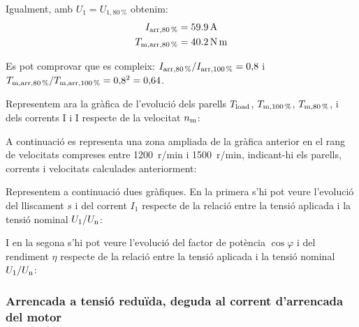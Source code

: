 \begin{exemple}
	Igualment, amb $U_1 = U_{1,\qty{80}{\%}}$ obtenim:
	\vspace{-2mm}
	\begin{align*}
		I_\mathrm{arr,\qty{80}{\%}} &=  \qty{59,9}{A} \\
		T_\mathrm{m,arr,\qty{80}{\%}} &=  \qty{40,2}{N.m} 
	\end{align*}
	
	Es pot comprovar que es compleix: $I_\mathrm{arr,\qty{80}{\%}} / I_\mathrm{arr,\qty{100}{\%}} = 0{,}8$ i $T_\mathrm{m,arr,\qty{80}{\%}} / T_\mathrm{m,arr,\qty{100}{\%}} = 0{,}8^2 = 0{,}64$.
		
 	Representem ara la gràfica de l'evolució dels parells $T_\mathrm{load}$,  $T_\mathrm{m,\qty{100}{\%}}$,  $T_\mathrm{m,\qty{80}{\%}}$, i dels	corrents I i I respecte de la velocitat $n_\mathrm{m}$:	
    \begin{center}
		\fontsize{10pt}{11pt}\selectfont
		
	\end{center}	

	\vspace{-2mm}
	A continuació es representa una zona ampliada de la gràfica anterior en el rang de velocitats compreses entre \qty{1200}{r/min} i  \qty{1500}{r/min}, indicant-hi els parells, corrents i velocitats calculades anteriorment:

	\begin{center}
		\fontsize{10pt}{11pt}\selectfont
		
	\end{center}

	Representem a continuació dues gràfiques. En la primera s'hi pot veure  l'evolució del lliscament $s$ i del corrent $I_1$ respecte de la relació entre la tensió aplicada i la tensió nominal $U_1/U_\mathrm{n}$:
	\begin{center}
		
	\end{center}
	
	I en la segona s'hi pot veure l'evolució del factor de potència $\cos\varphi$ i del rendiment $\eta$ respecte de la relació entre la tensió aplicada i la tensió nominal $U_1/U_\mathrm{n}$:
	\begin{center}
		
	\end{center}
\end{exemple} 


\subsubsection{Arrencada a tensió reduïda, deguda al  corrent d'arrencada del motor}

